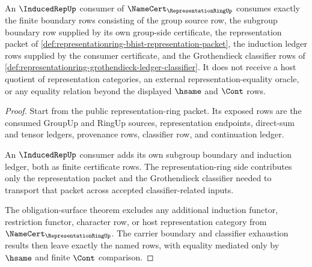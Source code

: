 \begin{theorem}
\label{thm:representationring-induced-consumer-boundary}
An $\InducedRepUp$ consumer of $\NameCert_{\RepresentationRingUp}$ consumes
exactly the finite boundary rows consisting of the group source row, the
subgroup boundary row supplied by its own group-side certificate, the
representation packet of
\autoref{def:representationring-bhist-representation-packet}, the induction
ledger rows supplied by the consumer certificate, and the Grothendieck
classifier rows of
\autoref{def:representationring-grothendieck-ledger-classifier}. It does not
receive a host quotient of representation categories, an external
representation-equality oracle, or any equality relation beyond the displayed
$\hsame$ and $\Cont$ rows.
\end{theorem}
\begin{proof}
Start from the public representation-ring packet. Its exposed rows are the
consumed GroupUp and RingUp sources, representation endpoints, direct-sum and
tensor ledgers, provenance rows, classifier row, and continuation ledger.

An $\InducedRepUp$ consumer adds its own subgroup boundary and induction
ledger, both as finite certificate rows. The representation-ring side
contributes only the representation packet and the Grothendieck classifier
needed to transport that packet across accepted classifier-related inputs.

The obligation-surface theorem excludes any additional induction functor,
restriction functor, character row, or host representation category from
$\NameCert_{\RepresentationRingUp}$. The carrier boundary and classifier
exhaustion results then leave exactly the named rows, with equality mediated
only by $\hsame$ and finite $\Cont$ comparison.
\end{proof}

